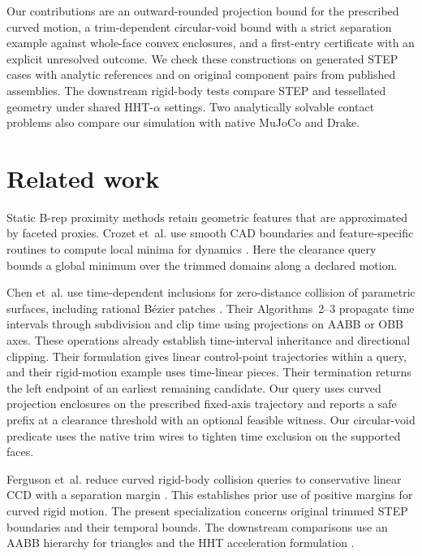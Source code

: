 \documentclass[10pt,a4paper]{article}
\begin{document}
Our contributions are an outward-rounded projection bound for the prescribed curved motion, a trim-dependent circular-void bound with a strict separation example against whole-face convex enclosures, and a first-entry certificate with an explicit unresolved outcome. We check these constructions on generated STEP cases with analytic references and on original component pairs from published assemblies. The downstream rigid-body tests compare STEP and tessellated geometry under shared HHT-$\alpha$ settings. Two analytically solvable contact problems also compare our simulation with native MuJoCo and Drake.

\section{Related work}

Static B-rep proximity methods retain geometric features that are approximated by faceted proxies. Crozet et~al. use smooth CAD boundaries and feature-specific routines to compute local minima for dynamics \cite{crozet2018}. Here the clearance query bounds a global minimum over the trimmed domains along a declared motion.

Chen et~al. use time-dependent inclusions for zero-distance collision of parametric surfaces, including rational B\'ezier patches \cite{chen2024}. Their Algorithms~2--3 propagate time intervals through subdivision and clip time using projections on AABB or OBB axes. These operations already establish time-interval inheritance and directional clipping. Their formulation gives linear control-point trajectories within a query, and their rigid-motion example uses time-linear pieces. Their termination returns the left endpoint of an earliest remaining candidate. Our query uses curved projection enclosures on the prescribed fixed-axis trajectory and reports a safe prefix at a clearance threshold with an optional feasible witness. Our circular-void predicate uses the native trim wires to tighten time exclusion on the supported faces.

Ferguson et~al. reduce curved rigid-body collision queries to conservative linear CCD with a separation margin \cite{ferguson2021}. This establishes prior use of positive margins for curved rigid motion. The present specialization concerns original trimmed STEP boundaries and their temporal bounds. The downstream comparisons use an AABB hierarchy for triangles \cite{larsen2000} and the HHT acceleration formulation \cite{hilber1977,chrono}.
\end{document}
